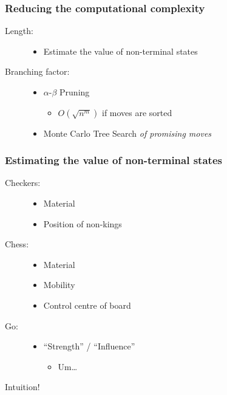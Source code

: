 \documentclass{beamer}
\begin{document}
\begin{frame}
  \frametitle{Reducing the computational complexity}
  \begin{description}
  \item[Length:]\hfill
    \begin{itemize}
    \item Estimate the value of non-terminal states
    \end{itemize}
  \item[Branching factor:]\hfill
    \begin{itemize}
    \item $\alpha$-$\beta$ Pruning
      \begin{itemize}
      \item $O\left(\sqrt{n^m}\right)$ if moves are sorted
      \end{itemize}
    \item Monte Carlo Tree Search {\em of promising moves}
    \end{itemize}
  \end{description}
\end{frame}



\begin{frame}
  \frametitle{Estimating the value of non-terminal states}
  \begin{description}
  \item[Checkers:]\hfill
    \begin{itemize}
    \item Material
    \item Position of non-kings
    \end{itemize}
  \item[Chess:]\hfill
    \begin{itemize}
    \item Material
    \item Mobility
    \item Control centre of board
    \end{itemize}
  \item[Go:]\hfill
    \begin{itemize}
    \item ``Strength'' / ``Influence''
      \begin{itemize}
      \item Um\dots
      \end{itemize}
    \end{itemize}
  \end{description}
  \begin{tcolorbox}
    \begin{center}
      Intuition!
    \end{center}
  \end{tcolorbox}
\end{frame}
\end{document}
